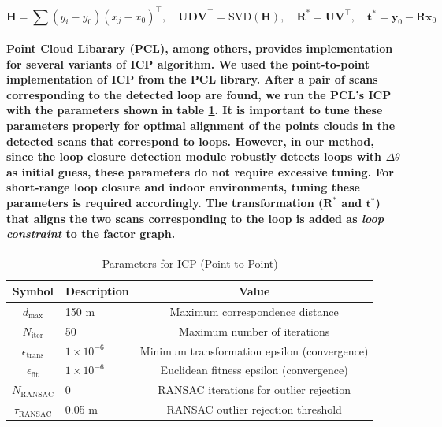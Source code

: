 \begin{equation}
	\mathbf{H} = \sum (y_i - y_0)(x_j - x_0)^\top, \quad
	\mathbf{U} \mathbf{D} \mathbf{V}^\top = \mathrm{SVD}(\mathbf{H}), \quad 
	\mathbf{R^*} = \mathbf{U} \mathbf{V}^\top, \quad 
	\mathbf{t^*} = \mathbf{y}_0 - \mathbf{R} \mathbf{x}_0
	\label{eq:matrix_h}
\end{equation}
\paragraph{\textnormal{Point Cloud Libarary (PCL), among others, provides implementation for several variants of ICP algorithm. We used the point-to-point implementation of ICP from the PCL library. After a pair of scans corresponding to the detected loop are found, we run the PCL's ICP with the parameters shown in table \ref{tab:icp_symbolic_params}. It is important to tune these parameters properly for optimal alignment of the points clouds in the detected scans that correspond to loops. However, in our method, since the loop closure detection module robustly detects loops with $\Delta \theta$ as initial guess, these parameters do not require excessive tuning. For short-range loop closure and indoor environments, tuning these parameters is required accordingly. The transformation ($\mathbf{R^*}$ and $\mathbf{t^*}$) that aligns the two scans corresponding to the loop is added as \textit{loop constraint} to the factor graph.}}
\begin{table}[htbp]
	\centering
	\caption{Parameters for ICP (Point-to-Point)}
	\begin{tabular}{|c|l|c|}
		\hline
		\textbf{Symbol} & \textbf{Description} & \textbf{Value} \\
		\hline
		$d_{\text{max}}$ & 150 m & Maximum correspondence distance \\
		$N_{\text{iter}}$ & 50 & Maximum number of iterations \\
		$\epsilon_{\text{trans}}$  & $1 \times 10^{-6}$ & Minimum transformation epsilon (convergence)\\
		$\epsilon_{\text{fit}}$ & $1 \times 10^{-6}$& Euclidean fitness epsilon (convergence)  \\
		$N_{\text{RANSAC}}$ & 0 & RANSAC iterations for outlier rejection \\
		$\tau_{\text{RANSAC}}$ & 0.05 m & RANSAC outlier rejection threshold \\
		\hline
	\end{tabular}
	\label{tab:icp_symbolic_params}
\end{table}
